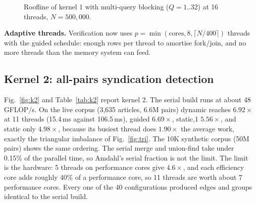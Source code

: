 \documentclass[conference,a4paper]{IEEEtran}
\begin{document}
\begin{figure}[!t]
\centering
{}
\caption{Roofline of kernel 1 with multi-query blocking ($Q=1..32$) at 16 threads, $N=500{,}000$.}
\label{fig:roofline}
\end{figure}

\textbf{Adaptive threads.} Verification now uses $p=\min(\text{cores},8,\lceil N/400\rceil)$ threads with the guided
schedule: enough rows per thread to amortise fork/join, and no more threads than the memory system can feed.

\subsection{Kernel 2: all-pairs syndication detection}
Fig.~\ref{fig:k2} and Table~\ref{tab:k2} report kernel 2. The serial build runs at about 48\,GFLOP/s. On the live
corpus (3,635 articles, 6.6M pairs) dynamic reaches $6.92\times$ at 11 threads (15.4\,ms against 106.5\,ms), guided
$6.69\times$, static,1 $5.56\times$, and static only $4.98\times$, because its busiest thread does $1.90\times$ the
average work, exactly the triangular imbalance of Fig.~\ref{fig:tri}. The 10K synthetic corpus (50M pairs) shows the
same ordering. The serial merge and union-find take under 0.15\% of the parallel time, so Amdahl's serial fraction is
not the limit. The limit is the hardware: 5 threads on performance cores give $4.6\times$, and each efficiency core
adds roughly 40\% of a performance core, so 11 threads are worth about 7 performance cores. Every one of the 40
configurations produced edges and groups identical to the serial build.
\end{document}
